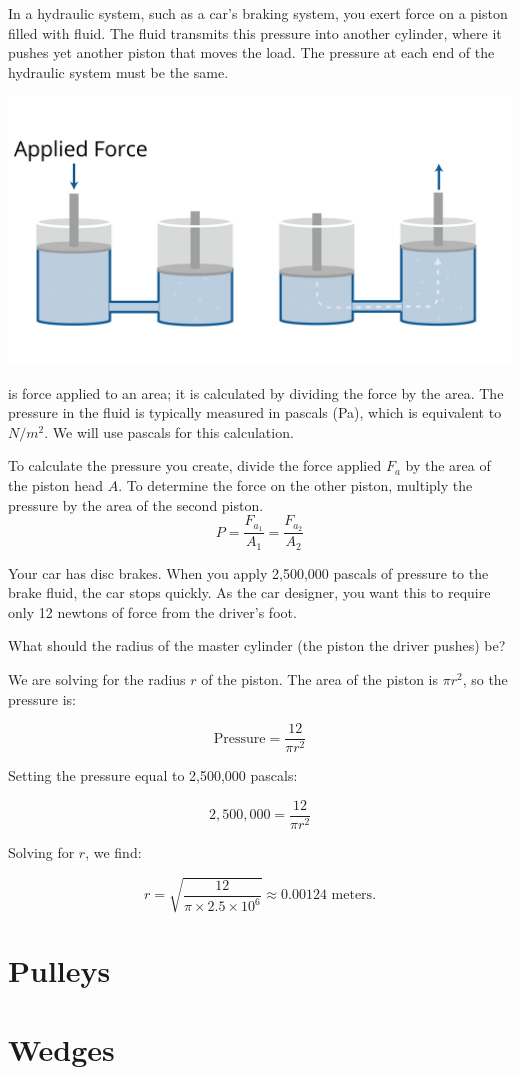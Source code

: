 In a hydraulic system, such as a car's braking system, you exert force on a piston filled with fluid. The fluid transmits this pressure into another cylinder, where it pushes yet another piston that moves the load. The pressure at each end of the hydraulic system must be the same. 

\includegraphics[width=\textwidth]{hydraulicsNew.png}

 is force applied to an area; it is calculated by dividing the force by the area.  The pressure in the fluid is typically measured in pascals (Pa), which is equivalent to \(N / m^2\). We will use pascals for this calculation.

To calculate the pressure you create, divide the force applied $F_{a}$ by the area of the piston head $A$. To determine the force on the other piston, multiply the pressure by the area of the second piston.
\[
P = \frac{F_{a_1}}{A_1} = \frac{F_{a_2}}{A_2}
\]


\begin{Exercise}[title={Hydraulics}, label=hydraulics]
Your car has disc brakes. When you apply 2,500,000 pascals of pressure to the brake fluid, the car stops quickly. As the car designer, you want this to require only 12 newtons of force from the driver's foot.

What should the radius of the master cylinder (the piston the driver pushes) be?
\end{Exercise}
\begin{Answer}[ref=hydraulics]
We are solving for the radius \( r \) of the piston. The area of the piston is \( \pi r^2 \), so the pressure is:

\[
\text{Pressure} = \frac{12}{\pi r^2}
\]

Setting the pressure equal to 2,500,000 pascals:

\[
2,500,000 = \frac{12}{\pi r^2}
\]

Solving for \( r \), we find:

\[
r = \sqrt{\frac{12}{\pi \times 2.5 \times 10^6}} \approx 0.00124 \text{ meters}.
\]
\end{Answer}

\section{Pulleys}

\section{Wedges}
